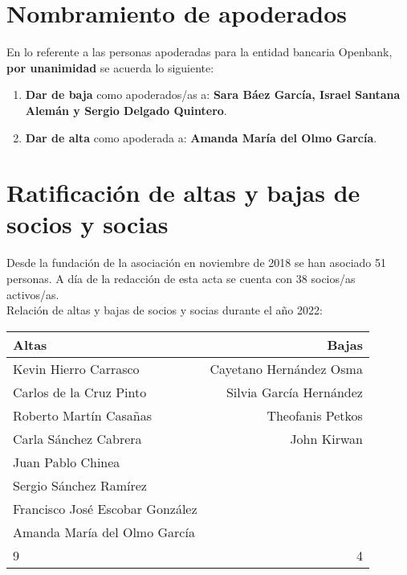 \documentclass[a4paper,12pt]{article}
\begin{document}
\section{Nombramiento de apoderados}

En lo referente a las personas apoderadas para la entidad bancaria Openbank, \textbf{por unanimidad} se acuerda lo siguiente:

\begin{enumerate}
    \item \textbf{Dar de baja} como apoderados/as a: \textbf{Sara Báez García, Israel Santana Alemán y Sergio Delgado Quintero}.
    \item \textbf{Dar de alta} como apoderada a: \textbf{Amanda María del Olmo García}.
\end{enumerate}

\section{Ratificación de altas y bajas de socios y socias}

Desde la fundación de la asociación en noviembre de 2018 se han asociado 51 personas. A día de la redacción de esta acta se cuenta con 38 socios/as activos/as.\\

Relación de altas y bajas de socios y socias durante el año 2022:

\begin{center}
    \begin{tabular}{ | l | r | }
        \hline
        \textbf{Altas} & \textbf{Bajas} \\ 
        \hline
        \hline
        Kevin Hierro Carrasco & Cayetano Hernández Osma\\  
        \hline
        Carlos de la Cruz Pinto & Silvia García Hernández \\  
        \hline
        Roberto Martín Casañas & Theofanis Petkos\\  
        \hline
        Carla Sánchez Cabrera & John Kirwan\\  
        \hline
        Juan Pablo Chinea & \\  
        \hline
        Sergio Sánchez Ramírez & \\  
        \hline
        Francisco José Escobar González & \\  
        \hline
        Amanda María del Olmo García & \\  
        \hline
        \hline
        9 & 4 \\  
        \hline
    \end{tabular}
\end{center}
\end{document}
